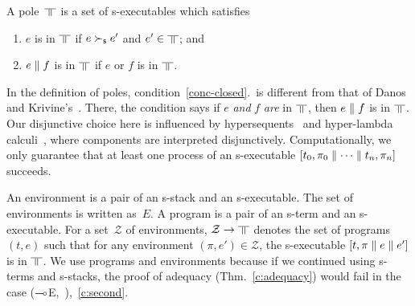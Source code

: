 \begin{definition}
 \label{def:pole}
A pole~$\bbot$ is a set of s-executables
which satisfies
\begin{enumerate}
 \item \label{red-closed} $e$ is in $\bbot$ if $e\succ_{\mathsf s} e'$ and
       $e'\in\bbot$; and
 \item \label{conc-closed} $e\parallel f$ is in $\bbot$ if $e$ or $f$ is in $\bbot$.
\end{enumerate}
\end{definition}
In the definition of poles,
condition~\ref{conc-closed}.~is different from that of Danos and Krivine's~\citep{danos-krivine}.
There, the condition says if $e$ \textit{and} $f$ \textit{are} in
$\bbot$, then $e\parallel f$ is in $\bbot$.  Our disjunctive choice here is influenced
by hypersequents~\citep{avron91} and hyper-lambda
calculi~\citep{hiraiflops2012},
where
components are interpreted disjunctively.
Computationally,
we only guarantee that at least one process of an s-executable
$[t_0,\pi_0\parallel \cdots \parallel t_n,\pi_n]$ succeeds.

An environment is a pair of an s-stack and an s-executable.
The set of environments is written as~$E$.
A program is a pair of an s-term and an s-executable.
For a set~$\mathcal Z$ of environments, $\mathcal Z\rightarrow\bbot$ denotes
the set of programs $(t,e)$ such that
for any environment $(\pi,e')\in \mathcal Z$,
the s-executable $[t,\pi\parallel e \parallel e']$ is in $\bbot$.
We use programs and environments because if we continued using
s-terms and s-stacks, the proof of adequacy (Thm.~\ref{c:adequacy})
would fail
in the case
($\multimap$E,~\textminus),~\ref{c:second}.


